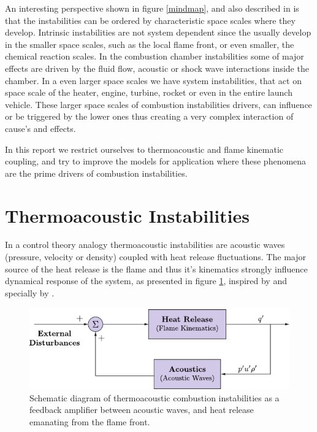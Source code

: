 An interesting perspective shown in figure \ref{mindmap}, and also described in \cite{barrere} is that the instabilities can be ordered by characteristic space scales where they develop. Intrinsic instabilities are not system dependent since the usually develop in the smaller space scales, such as the local flame front, or even smaller, the chemical reaction scales. In the combustion chamber instabilities some of major effects are driven by the fluid flow, acoustic or shock wave interactions inside the chamber. In a even larger space scales we have system instabilities, that act on space scale of the heater, engine, turbine, rocket or even in the entire launch vehicle.
These larger space scales of combustion instabilities drivers, can influence or be triggered by the lower ones thus creating a very complex interaction of cause's and effects.

In this report we restrict ourselves to thermoacoustic and flame kinematic coupling, and try to improve the models for application where these phenomena are the prime drivers of combustion instabilities. 

\section{Thermoacoustic Instabilities}
In a control theory analogy thermoacoustic instabilities are acoustic waves (pressure, velocity or density) coupled with heat release fluctuations. The major source of the heat release is the flame and thus it's kinematics strongly influence dynamical response of the system, as presented in figure \ref{feedback_combustion}, inspired by \cite{nato} and specially by \cite{ghoniem}.

\begin{figure}[h!]
\begin{center}
\includegraphics[scale=1.2]{./img/feedback_combustion}
\end{center}
\caption{Schematic diagram of thermoacoustic combustion instabilities as a feedback amplifier between acoustic waves, and heat release emanating from the flame front.}
\label{feedback_combustion}
\end{figure}

